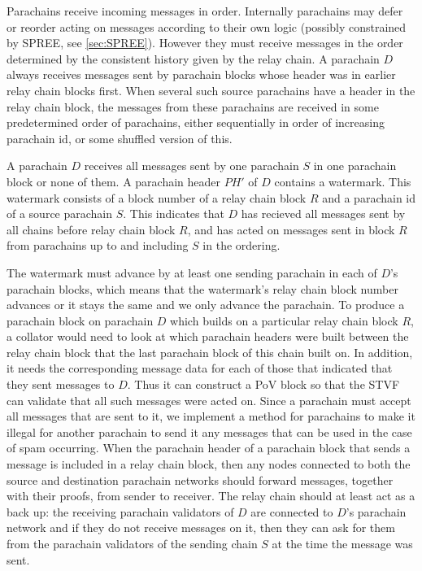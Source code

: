Parachains receive incoming messages in  order. Internally parachains may defer or reorder acting on messages according to their own logic (possibly constrained by SPREE, see \ref{sec:SPREE}). However they must receive messages in the order determined by the consistent history given by the relay chain.
A parachain $D$ always receives messages sent by parachain blocks whose header was in earlier relay chain blocks first. When several such source parachains have a header in the relay chain block, the messages from these parachains are received in some predetermined order of parachains, either sequentially in order of increasing parachain id, or some shuffled version of this.

A parachain $ D  $ receives all messages sent by one parachain $ S $ in one parachain block or none of them.
A parachain header $PH'$ of $D$ contains a watermark. This watermark consists of a block number of a relay chain block $R$ and a parachain id of a source parachain $S$. This indicates that $D$ has recieved all messages sent by all chains before relay chain block $R$, and has acted on messages sent in block $R$ from parachains up to and including $S$ in the ordering.



The watermark must advance by at least one sending parachain in each of $ D $’s parachain blocks, which means that the watermark's relay chain block number advances or it stays the same and we only advance the parachain. To produce a parachain block on parachain $D$ which builds on a particular relay chain block $R$, a collator would need to look at which parachain headers were built between the relay chain block that the last parachain block of this chain built on. In addition, it needs the corresponding message data for each of those that indicated that they sent messages to $D$.
Thus it can construct a PoV block so that the STVF can validate that all such messages were acted on. Since a parachain must accept all messages that are sent to it,
we implement a method for parachains to make it illegal for another parachain to send it any messages that can be used in the case of spam occurring. When the parachain header of a parachain block that sends a message is included in a relay chain block, then any nodes connected to both the source and destination parachain networks should forward messages, together with their proofs, from sender to receiver.
 The relay chain should at least act as a back up: the receiving parachain validators  of $D$ are connected to $D$'s parachain network and if they do not receive messages on it, then they can ask for them from the parachain validators of the sending chain $S$ at the time the message was sent.

